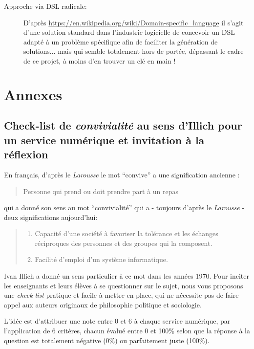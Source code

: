 \documentclass[11pt,a4paper]{article}
\begin{document}
\begin{description}
    \item[Approche via DSL radicale:] D'après \url{https://en.wikipedia.org/wiki/Domain-specific_language} il s'agit d'une solution standard dans l'industrie logicielle de concevoir un DSL adapté à un problème spécifique afin de faciliter la génération de solutions... mais qui semble totalement hors de portée, dépassant le cadre de ce projet, à moins d'en trouver un clé en main !
    
\end{description}

\newpage


\newpage
\section{Annexes}

\subsection{Check-list de \textit{convivialité} au sens d'Illich pour un service numérique et invitation à la réflexion}
En français, d'après le \textit{Larousse} le mot ``convive'' a une signification ancienne : \begin{quote}
    Personne qui prend ou doit prendre part à un repas
\end{quote} qui a donné son sens au mot ``convivialité'' qui a - toujours d'après le \textit{Larousse} - deux significations aujourd'hui: \begin{quote}
\begin{enumerate}
    \item Capacité d'une société à favoriser la tolérance et les échanges réciproques des personnes et des groupes qui la composent.
    \item Facilité d'emploi d'un système informatique.
\end{enumerate}
\end{quote}
Ivan Illich a donné un sens particulier à ce mot dans les années 1970. Pour inciter les enseignants et leurs élèves à se questionner sur le sujet, nous vous proposons une \textit{check-list} pratique et facile à mettre en place, qui ne nécessite pas de faire appel aux auteurs originaux de philosophie politique et sociologie.
\par L'idée est d'attribuer une note entre 0 et 6 à chaque service numérique, par l'application de 6 critères, chacun évalué entre 0 et 100\% selon que la réponse à la question est totalement négative (0\%) ou parfaitement juste (100\%).
\end{document}
